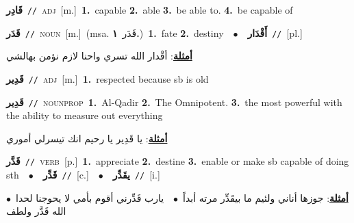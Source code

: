\documentclass[10pt,a4paper,twoside]{article} %
\begin{document}
\begin{multicols}{2}
{\setlength\topsep{0pt}\textbf{\foreignlanguage{arabic}{قَادِر}}\ {\color{gray}\texttt{//}\color{black}}\ \textsc{adj}\ [m.]\ \textbf{1.}~capable  \textbf{2.}~able  \textbf{3.}~be able to.  \textbf{4.}~be capable of\ } \vspace{2mm}

{\setlength\topsep{0pt}\textbf{\foreignlanguage{arabic}{قَدَر}}\ {\color{gray}\texttt{//}\color{black}}\ \textsc{noun}\ [m.]\ \color{gray}(msa. \foreignlanguage{arabic}{قَدَر}~\foreignlanguage{arabic}{\textbf{١.}})\color{black}\ \textbf{1.}~fate  \textbf{2.}~destiny\ \ $\bullet$\ \ \setlength\topsep{0pt}\textbf{\foreignlanguage{arabic}{أَقْدَار}}\ {\color{gray}\texttt{//}\color{black}}\ [pl.]\  \begin{flushright}\color{gray}\foreignlanguage{arabic}{\textbf{\underline{\foreignlanguage{arabic}{أمثلة}}}: أقْدار الله تسري واحنا لازم نؤمن بهالشي}\end{flushright}\color{black}} \vspace{2mm}

{\setlength\topsep{0pt}\textbf{\foreignlanguage{arabic}{قَدِير}}\ {\color{gray}\texttt{//}\color{black}}\ \textsc{adj}\ [m.]\ \textbf{1.}~respected because sb is old\ } \vspace{2mm}

{\setlength\topsep{0pt}\textbf{\foreignlanguage{arabic}{قَدِير}}\ {\color{gray}\texttt{//}\color{black}}\ \textsc{noun\textunderscore prop}\ \textbf{1.}~Al-Qadir  \textbf{2.}~The Omnipotent.  \textbf{3.}~the most powerful with the ability to measure out everything\  \begin{flushright}\color{gray}\foreignlanguage{arabic}{\textbf{\underline{\foreignlanguage{arabic}{أمثلة}}}: يا قَدِير يا رحيم انك تيسرلي أموري}\end{flushright}\color{black}} \vspace{2mm}

{\setlength\topsep{0pt}\textbf{\foreignlanguage{arabic}{قَدَّر}}\ {\color{gray}\texttt{//}\color{black}}\ \textsc{verb}\ [p.]\ \textbf{1.}~appreciate  \textbf{2.}~destine  \textbf{3.}~enable or make sb capable of doing sth\ \ $\bullet$\ \ \setlength\topsep{0pt}\textbf{\foreignlanguage{arabic}{قَدِّر}}\ {\color{gray}\texttt{//}\color{black}}\ [c.]\ \ $\bullet$\ \ \setlength\topsep{0pt}\textbf{\foreignlanguage{arabic}{يقَدِّر}}\ {\color{gray}\texttt{//}\color{black}}\ [i.]\  \begin{flushright}\color{gray}\foreignlanguage{arabic}{\textbf{\underline{\foreignlanguage{arabic}{أمثلة}}}: جوزها أناني ولئيم ما بيقَدِّر مرته أبداً\ $\bullet$\ \  يارب قَدِّرني أقوم بأمي لا يحوجنا لحدا\ $\bullet$\ \  الله قَدَّر ولطف}\end{flushright}\color{black}} \vspace{2mm}


\end{multicols}
\end{document}
